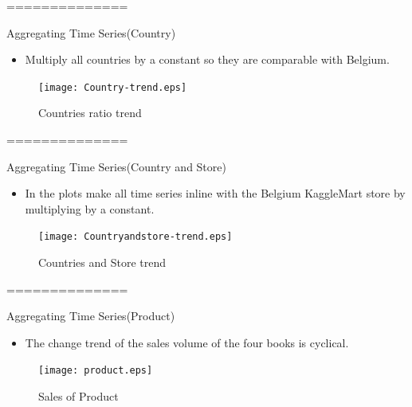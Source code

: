 \documentclass[
 size=14pt,
 paper=smartboard,  %
 mode=present, 		%
 display=slides, 	%
 style=tuliplab,  	%
 pauseslide,
 fleqn,leqno]{powerdot}
\begin{document}
==============
\begin{slide}[toc=,bm=]{Aggregating Time Series(Country)}
	\begin{itemize}
		\item
		Multiply all countries by a constant so they are comparable with Belgium.
	\end{itemize}
		\begin{figure}
			\centering
			\texttt{[image: Country-trend.eps]}
			\caption{Countries ratio trend}\label{fig:OutAspect-target}
		\end{figure}

\end{slide}

==============
\begin{slide}[toc=,bm=]{Aggregating Time Series(Country and Store)}
	\begin{itemize}
		\item
		In the plots make all time series inline with the Belgium KaggleMart store by multiplying by a constant.
	\end{itemize}
		\begin{figure}
			\centering
			\texttt{[image: Countryandstore-trend.eps]}
			\caption{Countries and Store trend}\label{fig:OutAspect-target}
		\end{figure}
\end{slide}

==============
\begin{slide}[toc=,bm=]{Aggregating Time Series(Product)}
	\begin{itemize}
		\item
		The change trend of the sales volume of the four books is cyclical.
	\end{itemize}

		\begin{figure}
			\centering
			\texttt{[image: product.eps]}
			\caption{Sales of Product}\label{fig:OutAspect-target}
		\end{figure}

\end{slide}
\end{document}
